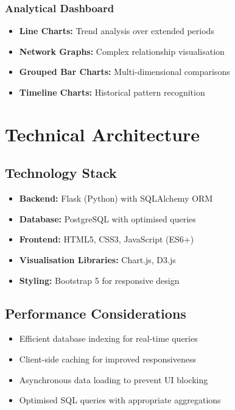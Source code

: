 \documentclass[11pt,a4paper]{article}
\begin{document}
\subsubsection{Analytical Dashboard}
\begin{itemize}
    \item \textbf{Line Charts:} Trend analysis over extended periods
    \item \textbf{Network Graphs:} Complex relationship visualisation
    \item \textbf{Grouped Bar Charts:} Multi-dimensional comparisons
    \item \textbf{Timeline Charts:} Historical pattern recognition
\end{itemize}

\section{Technical Architecture}

\subsection{Technology Stack}
\begin{itemize}
    \item \textbf{Backend:} Flask (Python) with SQLAlchemy ORM
    \item \textbf{Database:} PostgreSQL with optimised queries
    \item \textbf{Frontend:} HTML5, CSS3, JavaScript (ES6+)
    \item \textbf{Visualisation Libraries:} Chart.js, D3.js
    \item \textbf{Styling:} Bootstrap 5 for responsive design
\end{itemize}

\subsection{Performance Considerations}
\begin{itemize}
    \item Efficient database indexing for real-time queries
    \item Client-side caching for improved responsiveness
    \item Asynchronous data loading to prevent UI blocking
    \item Optimised SQL queries with appropriate aggregations
\end{itemize}
\end{document}
